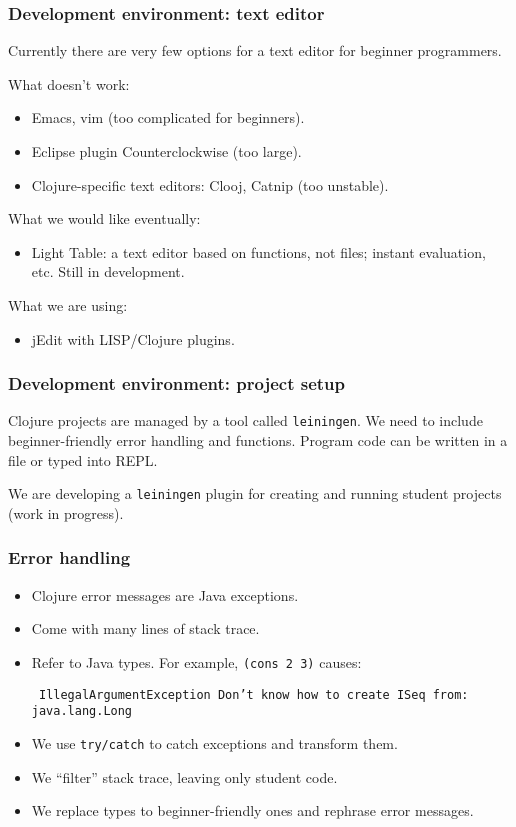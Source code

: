 \documentclass{beamer}
\newcommand{\allcomments}[1]{{#1}}
\newcommand{\joecomment}[1]{{\bf \color{JoesGold}{\allcomments{{#1}}}}}
\newcommand{\elenacomment}[1]{{\bf \textcolor{ForestGreen}{\allcomments{{#1}}}}}
\begin{document}
\begin{frame}
\frametitle{Development environment: text editor}
Currently there are very few options for a text editor for beginner programmers. 

What doesn't work:
\begin{itemize}
\item Emacs, vim (too complicated for beginners).
\item Eclipse plugin Counterclockwise (too large).
\item Clojure-specific text editors: Clooj, Catnip (too unstable). 
\end{itemize}
What we would like eventually:
\begin{itemize}
\item Light Table: a text editor based on functions, not files; instant evaluation, etc. Still in development. 
\end{itemize}
What we are using:
\begin{itemize}
\item jEdit with LISP/Clojure plugins. 
\end{itemize}
\end{frame}

\begin{frame}
\frametitle{Development environment: project setup}
Clojure projects are managed by a tool called {\tt leiningen}. We need to include beginner-friendly error handling and functions. Program code can be written in a file or typed into REPL. 

\vspace*{.1in}

We are developing a {\tt leiningen} plugin for creating and running student projects (work in progress).
\end{frame}

\begin{frame}
\frametitle{Error handling}
\begin{itemize}
\item Clojure error messages are Java exceptions. 
\item Come with many lines of stack trace. 
\item Refer to Java types. For example, {\tt (cons 2 3)} causes:

{\tt
IllegalArgumentException Don't know how to create ISeq from: java.lang.Long
}
\item We use {\tt try/catch} to catch exceptions and transform them. 
\item We ``filter'' stack trace, leaving only student code. 
\item We replace types to beginner-friendly ones and rephrase error messages. 
\end{itemize}
\end{frame}
\end{document}
